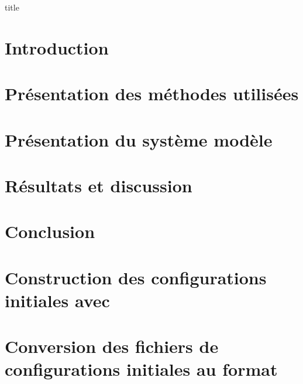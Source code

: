 \documentclass[a4paper, 11pt]{article}
\begin{document}
    {title}
\clearpage


\tableofcontents
\thispagestyle{empty}
\clearpage


\setcounter{page}{1}
\section*{Introduction}

    
\clearpage

\section{Présentation des méthodes utilisées}

    
\clearpage


\section{Présentation du système modèle} \label{sec:systeme_modele}

    
\clearpage


\section{Résultats et discussion}

    
\clearpage
    
\clearpage


\section{Conclusion}


\clearpage


\appendix
{}
\section{Construction des configurations initiales avec \packmol{}} \label{apdx:packmol}

    
\clearpage

\section{Conversion des fichiers de configurations initiales au format \lammps{}} \label{apdx:conversion_lammps}

    
    
\clearpage


\printbibliography
\end{document}
